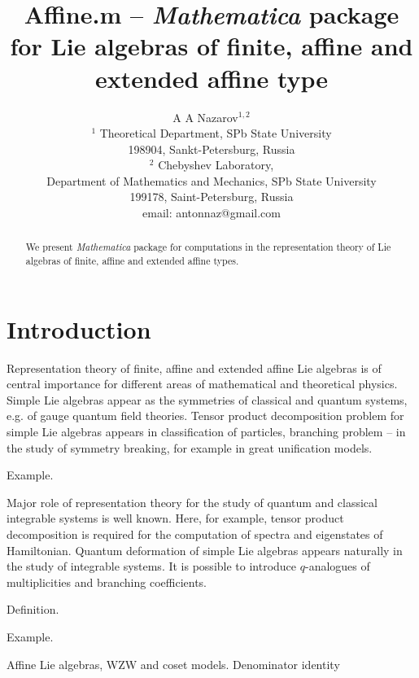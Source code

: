 \documentclass[12pt]{article}
\theoremstyle{definition}
\begin{document}
\title{{\bf Affine.m} -- {\it Mathematica} package for Lie algebras of finite, affine and extended affine type}
\author{A A Nazarov$^{1,2}$\\
{\small $^1$ Theoretical Department, SPb State University}\\
{\small 198904, Sankt-Petersburg, Russia}\\
{\small$^{2}$ Chebyshev Laboratory,}\\
{\small Department of Mathematics and Mechanics, SPb State University}\\
{\small 199178, Saint-Petersburg, Russia}\\
{\small email: antonnaz@gmail.com}}

\maketitle

\begin{abstract}
  We present {\it Mathematica} package for computations in the representation theory of Lie algebras of finite, affine and extended affine types. 
\end{abstract}


\section{Introduction}

Representation theory of finite, affine and extended affine Lie algebras is of central importance for different areas of mathematical and theoretical physics. Simple Lie algebras appear as the symmetries of classical and quantum systems, e.g. of gauge quantum field theories. Tensor product decomposition problem for simple Lie algebras appears in classification of particles, branching problem -- in the study of symmetry breaking, for example in great unification models. 

Example.

Major role of representation theory for the study of quantum and classical integrable systems is well known. Here, for example, tensor product decomposition is required for the computation of spectra and eigenstates of Hamiltonian. Quantum deformation of simple Lie algebras appears naturally in the study of integrable systems. It is possible to introduce $q$-analogues of multiplicities and branching coefficients. 

Definition.

Example.

Affine Lie algebras, WZW and coset models. Denominator identity 
\end{document}

